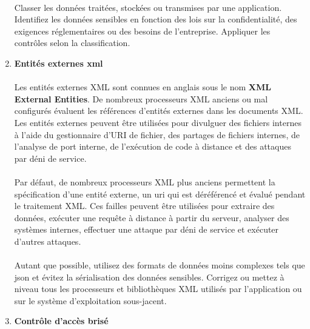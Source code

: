 \begin{enumerate}[label=\roman*)]
		\paragraph{}
		Classer les données traitées, stockées ou transmises par une application. Identifiez les données sensibles en fonction des lois sur la confidentialité, des exigences réglementaires ou des besoins de l'entreprise.
		Appliquer les contrôles selon la classification.

		\vspace*{0.8cm} \item \textbf{Entités externes \gls{xml}} \vspace*{-0.4cm}
		\paragraph{}
		Les entit\'es externes XML sont connues en anglais sous le nom \textbf{XML External Entities}.
		De nombreux processeurs XML anciens ou mal configurés évaluent les références d'entités externes dans les documents XML. Les entités externes peuvent être utilisées pour divulguer des fichiers internes à l'aide du gestionnaire d'URI de fichier, des partages de fichiers internes, de l'analyse de port interne, de l'exécution de code à distance et des attaques par déni de service.
		\paragraph{}
		Par défaut, de nombreux processeurs XML plus anciens permettent la spécification d'une entité externe, un \gls{uri} qui est déréférencé et évalué pendant le traitement XML. 
		Ces failles peuvent être utilisées pour extraire des données, exécuter une requête à distance à partir du serveur, analyser des systèmes internes, effectuer une attaque par déni de service et exécuter d'autres attaques.
		\paragraph{}
		Autant que possible, utilisez des formats de données moins complexes tels que \gls{json} et évitez la sérialisation des données sensibles.
		Corrigez ou mettez à niveau tous les processeurs et bibliothèques XML utilisés par l'application ou sur le système d'exploitation sous-jacent.

		\vspace*{0.8cm} \item \textbf{Contrôle d'accès brisé} \vspace*{-0.4cm}

\end{enumerate}
